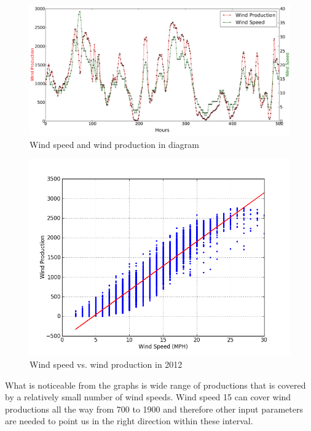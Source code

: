 \begin{figure}[H]
\centering
\includegraphics[width=0.99\linewidth,natwidth=898,natheight=587]{billeder/windSpeedWindProductionPlot.png}
\caption{Wind speed and wind production in diagram}
\label{fig:windSpeedWindProductionPlot}
\end{figure}

\begin{figure}[H]
\centering
\includegraphics[width=0.99\linewidth,natwidth=898,natheight=587]{billeder/WindSpeedVsProduction.png}
\caption{Wind speed vs. wind production in 2012}
\label{fig:windVsProd}
\end{figure}

What is noticeable from the graphs is wide range of productions that is covered by a relatively small number of wind speeds. Wind speed 15 can cover wind productions all the way from 700 to 1900 and therefore other input parameters are needed to point us in the right direction within these interval. 

